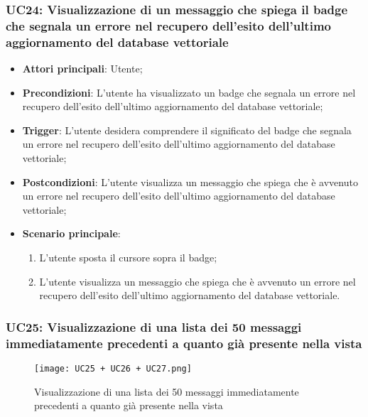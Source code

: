 \subsubsection{UC24: Visualizzazione di un messaggio che spiega il badge che segnala un errore nel recupero dell'esito dell'ultimo aggiornamento del database vettoriale}
\begin{itemize}
    \item \textbf{Attori principali}: Utente;
    \item \textbf{Precondizioni}: L'utente ha visualizzato un badge che segnala un errore nel recupero dell'esito dell'ultimo aggiornamento del database vettoriale;
    \item \textbf{Trigger}: L'utente desidera comprendere il significato del badge che segnala un errore nel recupero dell'esito dell'ultimo aggiornamento del database vettoriale;
    \item \textbf{Postcondizioni}: L'utente visualizza un messaggio che spiega che è avvenuto un errore nel recupero dell'esito dell'ultimo aggiornamento del database vettoriale;
    \item \textbf{Scenario principale}:
    \begin{enumerate}
        \item L'utente sposta il cursore sopra il badge;
        \item L'utente visualizza un messaggio che spiega che è avvenuto un errore nel recupero dell'esito dell'ultimo aggiornamento del database vettoriale.
    \end{enumerate}
\end{itemize}

\hypertarget{UC25}{}
\subsubsection{UC25: Visualizzazione di una lista dei 50 messaggi immediatamente precedenti a quanto già presente nella vista}

\begin{figure}[h]
    \centering
    \texttt{[image: UC25 + UC26 + UC27.png]}
    \caption{Visualizzazione di una lista dei 50 messaggi immediatamente precedenti a quanto già presente nella vista}
\end{figure}

